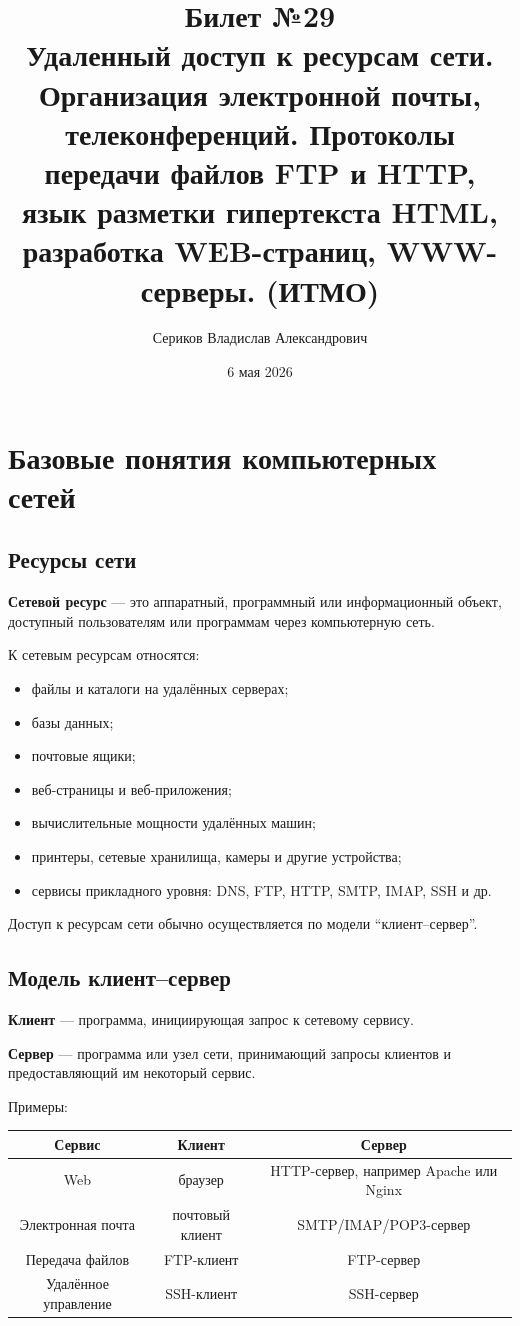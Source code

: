 \documentclass[12pt,a4paper]{article}
\title{Билет №29 \\ \small Удаленный доступ к ресурсам сети. Организация электронной почты, телеконференций. Протоколы передачи файлов FTP и HTTP, язык разметки гипертекста HTML, разработка WEB-страниц, WWW-серверы. (ИТМО)}
\author{Сериков Владислав Александрович}
\date{6 мая 2026}
\begin{document}
\maketitle
\tableofcontents
\newpage

\section{Базовые понятия компьютерных сетей}

\subsection{Ресурсы сети}

\textbf{Сетевой ресурс} --- это аппаратный, программный или информационный объект, доступный пользователям или программам через компьютерную сеть.

К сетевым ресурсам относятся:
\begin{itemize}
    \item файлы и каталоги на удалённых серверах;
    \item базы данных;
    \item почтовые ящики;
    \item веб-страницы и веб-приложения;
    \item вычислительные мощности удалённых машин;
    \item принтеры, сетевые хранилища, камеры и другие устройства;
    \item сервисы прикладного уровня: DNS, FTP, HTTP, SMTP, IMAP, SSH и др.
\end{itemize}

Доступ к ресурсам сети обычно осуществляется по модели ``клиент--сервер''.

\subsection{Модель клиент--сервер}

\textbf{Клиент} --- программа, инициирующая запрос к сетевому сервису.

\textbf{Сервер} --- программа или узел сети, принимающий запросы клиентов и предоставляющий им некоторый сервис.

Примеры:
\begin{center}
\begin{tabular}{|c|c|c|}
\hline
Сервис & Клиент & Сервер \\
\hline
Web & браузер & HTTP-сервер, например Apache или Nginx \\
\hline
Электронная почта & почтовый клиент & SMTP/IMAP/POP3-сервер \\
\hline
Передача файлов & FTP-клиент & FTP-сервер \\
\hline
Удалённое управление & SSH-клиент & SSH-сервер \\
\hline
\end{tabular}
\end{center}
\end{document}
